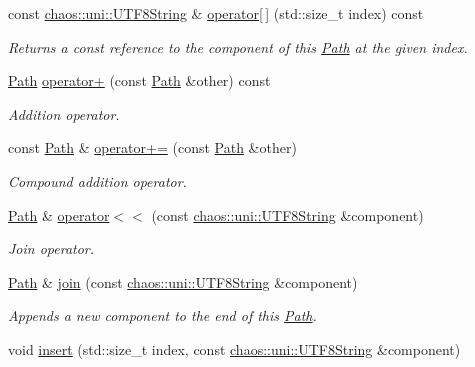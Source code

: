 \begin{DoxyCompactItemize}
const \hyperlink{classchaos_1_1uni_1_1_u_t_f8_string}{chaos\-::uni\-::\-U\-T\-F8\-String} \& \hyperlink{classchaos_1_1io_1_1sys_1_1_path_a2d2ac16a2a2964795e3872cdc9d08ab5}{operator\mbox{[}$\,$\mbox{]}} (std\-::size\-\_\-t index) const 
\begin{DoxyCompactList}\small\item\em Returns a const reference to the component of this \hyperlink{classchaos_1_1io_1_1sys_1_1_path}{Path} at the given index. \end{DoxyCompactList}\item 
\hyperlink{classchaos_1_1io_1_1sys_1_1_path}{Path} \hyperlink{classchaos_1_1io_1_1sys_1_1_path_a5e769fd87717e15f0580e9aacbc0a418}{operator+} (const \hyperlink{classchaos_1_1io_1_1sys_1_1_path}{Path} \&other) const 
\begin{DoxyCompactList}\small\item\em Addition operator. \end{DoxyCompactList}\item 
const \hyperlink{classchaos_1_1io_1_1sys_1_1_path}{Path} \& \hyperlink{classchaos_1_1io_1_1sys_1_1_path_a92a616d9f16047d8933020bab54ed494}{operator+=} (const \hyperlink{classchaos_1_1io_1_1sys_1_1_path}{Path} \&other)
\begin{DoxyCompactList}\small\item\em Compound addition operator. \end{DoxyCompactList}\item 
\hyperlink{classchaos_1_1io_1_1sys_1_1_path}{Path} \& \hyperlink{classchaos_1_1io_1_1sys_1_1_path_a9b3f24e1f3bcb8e989c4b21d70d0a052}{operator$<$$<$} (const \hyperlink{classchaos_1_1uni_1_1_u_t_f8_string}{chaos\-::uni\-::\-U\-T\-F8\-String} \&component)
\begin{DoxyCompactList}\small\item\em Join operator. \end{DoxyCompactList}\item 
\hyperlink{classchaos_1_1io_1_1sys_1_1_path}{Path} \& \hyperlink{classchaos_1_1io_1_1sys_1_1_path_a8fcd75bd349c4c6d1286f6549e34de8c}{join} (const \hyperlink{classchaos_1_1uni_1_1_u_t_f8_string}{chaos\-::uni\-::\-U\-T\-F8\-String} \&component)
\begin{DoxyCompactList}\small\item\em Appends a new component to the end of this \hyperlink{classchaos_1_1io_1_1sys_1_1_path}{Path}. \end{DoxyCompactList}\item 
void \hyperlink{classchaos_1_1io_1_1sys_1_1_path_a61c635ca77aee10536594cb86ed008fa}{insert} (std\-::size\-\_\-t index, const \hyperlink{classchaos_1_1uni_1_1_u_t_f8_string}{chaos\-::uni\-::\-U\-T\-F8\-String} \&component)

\end{DoxyCompactItemize}
